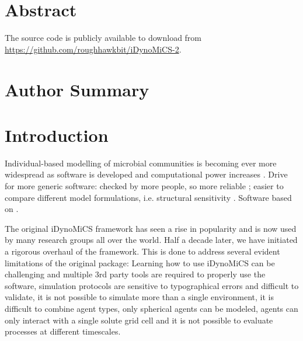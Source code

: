 \documentclass[10pt,letterpaper]{article}
\begin{document}
\section*{Abstract}


The source code is publicly available to download from \url{https://github.com/roughhawkbit/iDynoMiCS-2}.

\section*{Author Summary}

\linenumbers

\section*{Introduction}
Individual-based modelling of microbial communities is becoming ever more widespread as software is developed and computational power increases \cite{Ferrer2008}.
Drive for more generic software:
checked by more people, so more reliable \cite{Joppa2013};
easier to compare different model formulations, i.e. structural sensitivity  \cite{Adamson2013}.
Software based on \cite{Kreft1998, Lardon2011, Storck2014}. 


The original iDynoMiCS framework \cite{Lardon2011} has seen a rise in popularity and is now used by many research groups all over the world. Half a decade later, we have initiated a rigorous overhaul of the framework. This is done to address several evident limitations of the original package: Learning how to use iDynoMiCS can be challenging and multiple 3rd party tools are required to properly use the software, simulation protocols are sensitive to typographical errors and difficult to validate, it is not possible to simulate more than a single environment, it is difficult to combine agent types, only spherical agents can be modeled, agents can only interact with a single solute grid cell and it is not possible to evaluate processes at different timescales.
\end{document}
